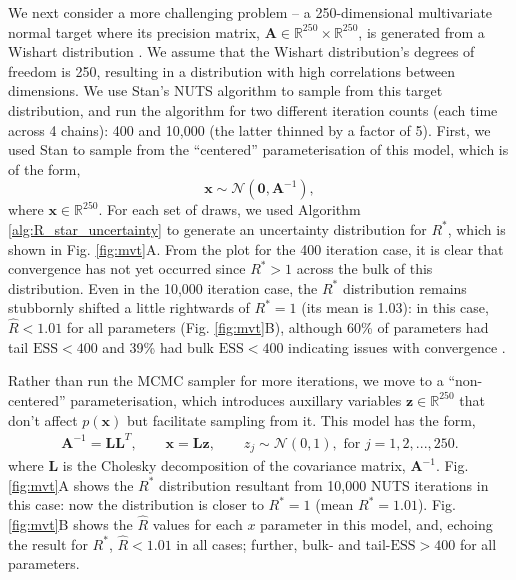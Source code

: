 \documentclass{article}
\begin{document}
We next consider a more challenging problem -- a 250-dimensional multivariate normal target where its precision matrix, $\boldsymbol{A}\in\mathbb{R}^{250}\times\mathbb{R}^{250}$, is generated from a Wishart distribution \citep{hoffman2014no}. We assume that the Wishart distribution's degrees of freedom is 250, resulting in a distribution with high correlations between dimensions. We use Stan's NUTS algorithm to sample from this target distribution, and run the algorithm for two different iteration counts (each time across 4 chains): 400 and 10,000 (the latter thinned by a factor of 5). First, we used Stan to sample from the ``centered'' parameterisation of this model, which is of the form,
%
\begin{equation}\label{eq:mvt_normal_250}
\boldsymbol{x}\sim \mathcal{N}(\boldsymbol{0},\boldsymbol{A}^{-1}),
\end{equation}
%
where $\boldsymbol{x}\in\mathbb{R}^{250}$. For each set of draws, we used Algorithm \ref{alg:R_star_uncertainty} to generate an uncertainty distribution for $R^*$, which is shown in Fig. \ref{fig:mvt}A. From the plot for the 400 iteration case, it is clear that convergence has not yet occurred since $R^*>1$ across the bulk of this distribution. Even in the 10,000 iteration case, the $R^*$ distribution remains stubbornly shifted a little rightwards of $R^*=1$ (its mean is 1.03): in this case, $\widehat{R}<1.01$ for all parameters (Fig. \ref{fig:mvt}B), although 60\% of parameters had tail $\text{ESS}<400$ and 39\% had bulk $\text{ESS}<400$ indicating issues with convergence \citep{vehtari2019rank}.

Rather than run the MCMC sampler for more iterations, we move to a ``non-centered'' parameterisation, which introduces auxillary variables $\boldsymbol{z}\in\mathbb{R}^{250}$ that don't affect $p(\boldsymbol{x})$ but facilitate sampling from it. This model has the form,
%
\begin{align}
\boldsymbol{A}^{-1} = \boldsymbol{L}\boldsymbol{L}^T,\qquad
\boldsymbol{x} = \boldsymbol{L} \boldsymbol{z},\qquad
z_j\sim \mathcal{N}(0, 1), \text{ for } j = 1,2,...,250.
\end{align}
%
where $\boldsymbol{L}$ is the Cholesky decomposition of the covariance matrix, $\boldsymbol{A}^{-1}$. Fig. \ref{fig:mvt}A shows the $R^*$ distribution resultant from 10,000 NUTS iterations in this case: now the distribution is closer to $R^*=1$ (mean $R^*=1.01$). Fig. \ref{fig:mvt}B shows the $\widehat{R}$ values for each $x$ parameter in this model, and, echoing the result for $R^*$, $\widehat{R}<1.01$ in all cases; further, bulk- and tail-$\text{ESS}>400$ for all parameters.
\end{document}
